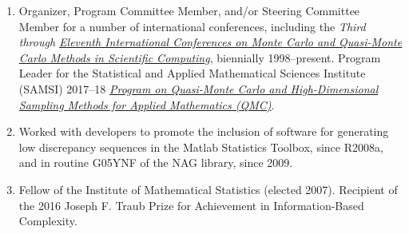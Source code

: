 \documentclass[11 pt]{NSFamsart}
\newcommand{\Matlab}{{\sc Matlab}\xspace}
\begin{document}
\begin{enumerate}
		\item Organizer, Program Committee Member, and/or Steering Committee Member for a number of international conferences, including the {\em Third through \href{http://mcqmc2018.inria.fr}{Eleventh
		International Conferences on Monte Carlo and
		Quasi-Monte Carlo Methods in Scientific Computing}}, biennially 1998--present.  Program 
		Leader for the Statistical and Applied Mathematical Sciences Institute (SAMSI) 
	2017--18 
	\href{https://www.samsi.info/programs-and-activities/year-long-research-programs/2017-18-program-quasi-monte-carlo-high-dimensional-sampling-methods-applied-mathematics-qmc/
		}{\emph{Program on Quasi-Monte Carlo and High-Dimensional Sampling Methods for Applied 
		Mathematics (QMC)}}.

		
		
		\item Worked with developers to promote the inclusion of software for generating low 
		discrepancy sequences in the \Matlab Statistics Toolbox, since R2008a, and in routine 
		G05YNF of the NAG library, since 2009.
		
			    \item Fellow of the Institute of Mathematical Statistics (elected 2007).  Recipient of the 
			    2016 
		Joseph F. Traub Prize for Achievement in Information-Based 
		Complexity.
		
		

		

\end{enumerate}
\end{document}
